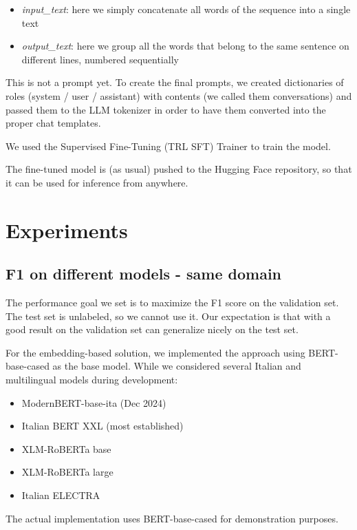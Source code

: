 \documentclass[11pt]{article}
\begin{document}
 \begin{itemize}
 	\item \emph{input\_text}: here we simply concatenate all words of the sequence into a single text
 	\item \emph{output\_text}: here we group all the words that belong to the same sentence on different lines, numbered sequentially
 \end{itemize}
 
 This is not a prompt yet. To create the final prompts, we created dictionaries of roles (system / user / assistant) with contents (we called them conversations) and passed them to the LLM tokenizer in order to have them converted into the proper chat templates. 
 
 We used the Supervised Fine-Tuning (TRL SFT) Trainer to train the model.

The fine-tuned model is (as usual) pushed to the Hugging Face repository, so that it can be used
for inference from anywhere.

\section{Experiments}

\subsection{F1 on different models - same domain}

The performance goal we set is to maximize the F1 score on the validation set. The test set is unlabeled, so we cannot use it. Our expectation is that with a good result on the
validation set can generalize nicely on the test set.

For the embedding-based solution, we implemented the approach using BERT-base-cased as the base model.
While we considered several Italian and multilingual models during development:

 \begin{itemize}
	\item ModernBERT-base-ita (Dec 2024)
	\item Italian BERT XXL (most established)
	\item XLM-RoBERTa base
	\item XLM-RoBERTa large
	\item Italian ELECTRA
\end{itemize}

The actual implementation uses BERT-base-cased for demonstration purposes.
\end{document}
